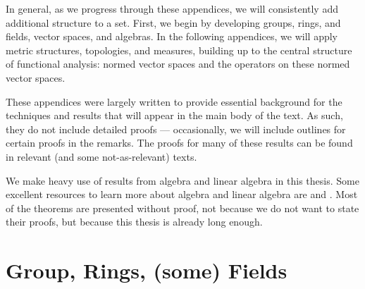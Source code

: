 In general, as we progress through these appendices, we will consistently add additional structure to a set. First, we begin by developing groups, rings, and fields, vector spaces, and algebras. In the following appendices, we will apply metric structures, topologies, and measures, building up to the central structure of functional analysis: normed vector spaces and the operators on these normed vector spaces.\newline

These appendices were largely written to provide essential background for the techniques and results that will appear in the main body of the text. As such, they do not include detailed proofs --- occasionally, we will include outlines for certain proofs in the remarks. The proofs for many of these results can be found in relevant (and some not-as-relevant) texts.\newline

We make heavy use of results from algebra and linear algebra in this thesis. Some excellent resources to learn more about algebra and linear algebra are \cite{dummit_and_foote} and \cite{algebra_chapter_0}. Most of the theorems are presented without proof, not because we do not want to state their proofs, but because this thesis is already long enough.
\section{Group, Rings, (some) Fields}%
